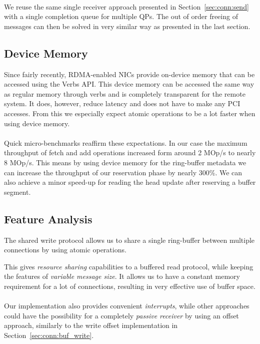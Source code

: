 \paragraph{} We reuse the same single receiver approach presented in Section~\ref{sec:conn:send} with a single completion queue for multiple
QPs. The out of order freeing of messages can then be solved in very similar way as presented in the last section.


\subsection{Device Memory}
Since fairly recently, RDMA-enabled NICs provide on-device memory that can be accessed using the Verbs API. This device memory can 
be accessed the same way as regular memory through verbs and is completely transparent for the remote system. It does, however,
reduce latency and does not have to make any PCI accesses. From this we especially expect atomic operations to be a lot faster
when using device memory.

\paragraph{} Quick micro-benchmarks reaffirm these expectations. In our case the maximum throughput of 
fetch and add operations 
increased form around 2 MOp/s to nearly 8 MOp/s. This means by using device memory for the ring-buffer
metadata we can increase
the throughput of our reservation phase by nearly 300\%. We can also achieve a minor speed-up for reading the head update after
reserving a buffer segment.


\subsection{Feature Analysis}

The shared write protocol allows us to share a single ring-buffer between multiple connections by using atomic operations.

This gives \emph{resource sharing} capabilities to a buffered read protocol, while keeping the features of 
\emph{variable message size}. It allows us to have a constant memory requirement for a lot of connections,
resulting in very effective use of buffer space.


\paragraph{} Our implementation also provides convenient \emph{interrupts}, while other approaches could have the possibility 
for a completely \emph{passive receiver} by using an offset approach, similarly to the write offset implementation in 
Section~\ref{sec:conn:buf_write}.

